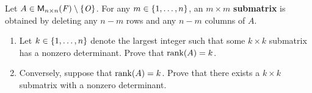 \begin{ex}\label{ex:4.3.23}
  Let \(A \in \mathsf{M}_{{n} \times n}({\mathit{F}}) \setminus \left\lbrace\mathit{O}\right\rbrace\).
  For any \(m \in \left\lbrace1, \dots, n\right\rbrace\), an \(m \times m\) \textbf{submatrix} is obtained by deleting any \(n - m\) rows and any \(n - m\) columns of \(A\).
  \begin{enumerate}
    \item Let \(k \in \left\lbrace1, \dots, n\right\rbrace\) denote the largest integer such that some \(k \times k\) submatrix has a nonzero determinant.
          Prove that \(\rk{A} = k\).
    \item Conversely, suppose that \(\rk{A} = k\).
          Prove that there exists a \(k \times k\) submatrix with a nonzero determinant.
  \end{enumerate}
\end{ex}

